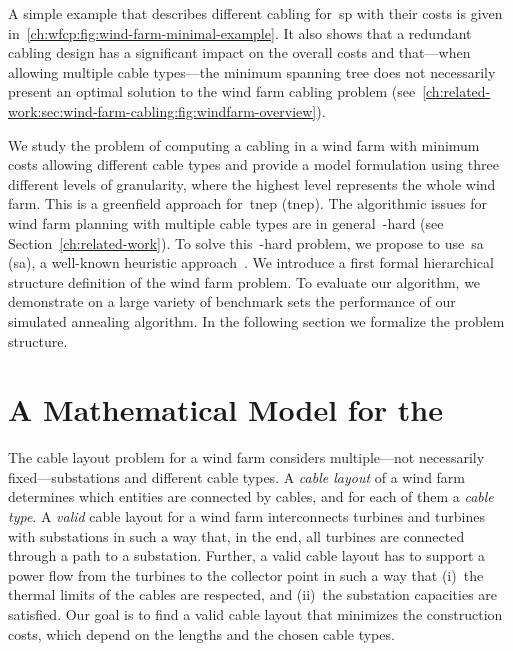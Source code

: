 % 
A simple example that describes different cabling for~\gls{sp} with their costs
is given in~\cref{ch:wfcp:fig:wind-farm-minimal-example}. It also shows that a
redundant cabling design has a significant impact on the overall costs and
that---when allowing multiple cable types---the minimum spanning tree does not
necessarily present an optimal solution to the wind farm cabling problem
(see~\cref{ch:related-work:sec:wind-farm-cabling:fig:windfarm-overview}).

We study the problem of computing a cabling in a wind farm with minimum costs
allowing different cable types and provide a model formulation using three
different levels of granularity, where the highest level represents the whole
wind farm. This is a greenfield approach for~\acrlong{tnep} (\gls{tnep}).
% 
The algorithmic issues for wind farm planning with multiple cable types are in
general~\NP-hard (see Section~\ref{ch:related-work}). To solve this~\NP-hard
problem, we propose to use~\acrlong{sa} (\gls{sa}), a well-known heuristic
approach~\parencite[pp.532ff., Section 5]{Osman1996}.
% 
We introduce a first formal hierarchical structure definition of the wind farm
problem. To evaluate our algorithm, we demonstrate on a large variety of
benchmark sets the performance of our simulated annealing algorithm. In the
following section we formalize the problem structure.
%
\section[A Mathematical Model for the Wind Farm Cabling Problem]{A Mathematical
Model for the \protect{}}
\label{ch:wfcp:sec:model}
%
The cable layout problem for a wind farm considers mul\-ti\-ple---not
necessarily fixed---substations and different cable types.  A \emph{cable
layout} of a wind farm determines which entities are connected by cables, and
for each of them a \emph{cable type}. A \emph{valid} cable layout for a wind
farm interconnects turbines and turbines with substations in such a way that, in
the end, all turbines are connected through a path to a substation.  Further, a
valid cable layout has to support a power flow from the turbines to the
collector point in such a way that (i)~the thermal limits of the cables are
respected, and (ii)~the substation capacities are satisfied. Our goal is to find
a valid cable layout that minimizes the construction costs, which depend on the
lengths and the chosen cable types.
% 
